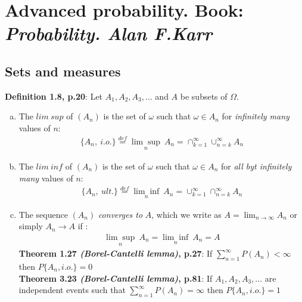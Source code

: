\documentclass[]{article}
\begin{document}
\section{Advanced probability. Book: \textit{Probability. Alan F.Karr}}
\subsection{Sets and measures}
\textbf{Definition 1.8, p.20}: Let $A_1, A_2, A_3, ...$ and $A$ be subsets of $\Omega$.
\begin{enumerate}[a)]
	\item The $lim~sup$ of $(A_n)$ is the set of $\omega$ such that $\omega \in A_n$ for \emph{infinitely many} values of $n$:
$$
\begin{aligned}
	\{A_n, ~i.o.\} \overset{def}{=} \underset{n}{\lim \sup} ~A_n = \cap_{k=1}^{\infty}\cup_{n=k}^{\infty} A_n
\end{aligned}
$$
	\item The $lim~inf$ of $(A_n)$ is the set of $\omega$ such that $\omega \in A_n$ for \emph{all byt infinitely many} values of $n$:
$$
\begin{aligned}
	\{A_n, ~ult.\} \overset{def}{=} \underset{n}{\lim \inf} ~A_n = \cup_{k=1}^{\infty}\cap_{n=k}^{\infty} A_n
\end{aligned}
$$
	\item The sequence $(A_n)$ \emph{converges to} $A$, which we write as $A=\lim_{n\rightarrow \infty} A_n$ or simply $A_n\rightarrow A$ if :
$$
\begin{aligned}
	\underset{n}{\lim \sup} ~A_n = \underset{n}{\lim \inf} ~A_n = A
	\end{aligned}
$$
\textbf{Theorem 1.27 \textit{(Borel-Cantelli lemma)}, p.27}: If $\sum_{n=1}^{\infty} P(A_n) < \infty$ then $P\{A_n, i.o.\} = 0$	\\
\textbf{Theorem 3.23 \textit{(Borel-Cantelli lemma)}, p.81}: If $A_1, A_2, A_3, ...$ are independent events such that $\sum_{n=1}^{\infty} P(A_n) = \infty$ then $P\{A_n, i.o.\} = 1$

\end{enumerate}
\end{document}
